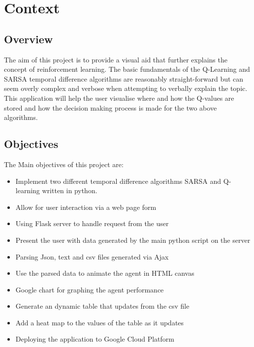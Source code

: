 \chapter{Context}

\section{Overview}
The aim of this project is to provide a visual aid that further explains the concept of reinforcement learning. The basic fundamentals of the Q-Learning and SARSA temporal difference algorithms are reasonably straight-forward but can seem overly complex and verbose when attempting to verbally explain the topic. This application will help the user visualise where and how the Q-values are stored and how the decision making process is made for the two above algorithms.

\section{Objectives}
The Main objectives of this project are:
\begin{itemize}
	\item Implement two different temporal difference algorithms SARSA and Q-learning written in python.
	\item Allow for user interaction via a web page form
	\item Using Flask server to handle request from the user
	\item Present the user with data generated by the main python script on the server 
	\item Parsing Json, text and csv files generated via Ajax
	\item Use the parsed data to animate the agent in HTML canvas
	\item Google chart for graphing the agent performance
	\item Generate an dynamic table that updates from the csv file
	\item Add a heat map to the values of the table as it updates
	\item Deploying the application to Google Cloud Platform

\end{itemize}
 


